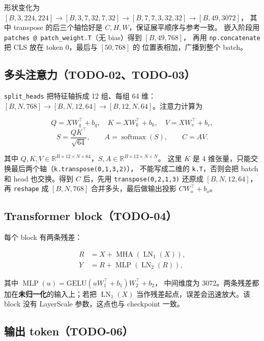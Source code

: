 \documentclass[a4paper,12pt]{article}
\begin{document}
形状变化为
$[B,3,224,224]\to[B,3,7,32,7,32]\to[B,7,7,3,32,32]\to[B,49,3072]$，
其中 transpose 的后三个轴恰好是 $C,H,W$，保证展平顺序与参考一致。
嵌入阶段用 \texttt{patches @ patch\_weight.T}（无 bias）得到 $[B,49,768]$，
再用 \texttt{np.concatenate} 把 CLS 放在 token 0，最后与 $[50,768]$ 的
位置表相加，广播到整个 batch。

\subsection{多头注意力（TODO-02、TODO-03）}

\texttt{split\_heads} 把特征轴拆成 12 组、每组 64 维：
$[B,N,768]\to[B,N,12,64]\to[B,12,N,64]$。注意力计算为

\begin{equation}
Q=XW_q^{\top}+b_q,\quad K=XW_k^{\top}+b_k,\quad V=XW_v^{\top}+b_v,
\end{equation}
\begin{equation}
S=\frac{QK^{\top}}{\sqrt{64}},\qquad
A=\operatorname{softmax}(S),\qquad
C=AV .
\end{equation}

其中 $Q,K,V\in\mathbb{R}^{B\times12\times N\times64}$，$S,A\in\mathbb{R}^{B\times12\times N\times N}$。
这里 $K$ 是 4 维张量，只能交换最后两个轴（\texttt{k.transpose(0,1,3,2)}），
不能写成二维的 \texttt{k.T}，否则会把 batch 和 head 也交换。得到
$C$ 后，先用 \texttt{transpose(0,2,1,3)} 还原成 $[B,N,12,64]$，再
\texttt{reshape} 成 $[B,N,768]$ 合并多头，最后做输出投影
$C W_o^{\top}+b_o$。

\subsection{Transformer block（TODO-04）}

每个 block 有两条残差：

\begin{align}
R &= X + \operatorname{MHA}(\operatorname{LN}_1(X)),\\
Y &= R + \operatorname{MLP}(\operatorname{LN}_2(R)),
\end{align}

其中 $\operatorname{MLP}(u)=\mathrm{GELU}(uW_1^{\top}+b_1)W_2^{\top}+b_2$，
中间维度为 3072。两条残差都加在\textbf{未归一化}的输入上；若把
$\operatorname{LN}_1(X)$ 当作残差起点，误差会迅速放大。该 block 没有
LayerScale 参数，这点也与 checkpoint 一致。

\subsection{输出 token（TODO-06）}
\end{document}
